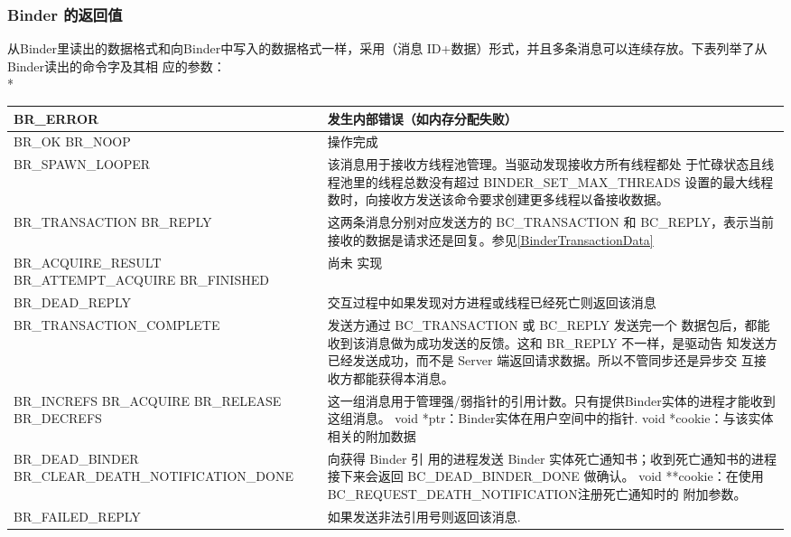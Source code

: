 \documentclass[a4paper,11pt]{article}
\begin{document}
\subsubsection{Binder 的返回值}
从Binder里读出的数据格式和向Binder中写入的数据格式一样，采用（消息
ID+数据）形式，并且多条消息可以连续存放。下表列举了从Binder读出的命令字及其相
应的参数：\\*
\begin{longtable}{|p{}|p{}|}\hline
    BR_ERROR & 发生内部错误（如内存分配失败） \\\hline
    BR_OK \newline BR_NOOP & 操作完成 \\\hline
    BR_SPAWN_LOOPER & 该消息用于接收方线程池管理。当驱动发现接收方所有线程都处
    于忙碌状态且线程池里的线程总数没有超过 BINDER_SET_MAX_THREADS
    设置的最大线程数时，向接收方发送该命令要求创建更多线程以备接收数据。
    \\\hline
    BR_TRANSACTION \newline BR_REPLY & 这两条消息分别对应发送方的
    BC_TRANSACTION 和 BC_REPLY，表示当前接收的数据是请求还是回复。参见\ref{BinderTransactionData}\\\hline
    BR_ACQUIRE_RESULT \newline BR_ATTEMPT_ACQUIRE \newline BR_FINISHED & 尚未
    实现 \\\hline
    BR_DEAD_REPLY & 交互过程中如果发现对方进程或线程已经死亡则返回该消息
    \\\hline
    BR_TRANSACTION_COMPLETE & 发送方通过 BC_TRANSACTION 或 BC_REPLY 发送完一个
    数据包后，都能收到该消息做为成功发送的反馈。这和 BR_REPLY 不一样，是驱动告
    知发送方已经发送成功，而不是 Server 端返回请求数据。所以不管同步还是异步交
    互接收方都能获得本消息。\\\hline
    BR_INCREFS \newline  BR_ACQUIRE \newline BR_RELEASE \newline BR_DECREFS \newline
    & 这一组消息用于管理强/弱指针的引用计数。只有提供Binder实体的进程才能收到这组消息。
   void *ptr：Binder实体在用户空间中的指针.  void *cookie：与该实体相关的附加数据 \\\hline
   BR_DEAD_BINDER \newline BR_CLEAR_DEATH_NOTIFICATION_DONE & 向获得 Binder 引
   用的进程发送 Binder 实体死亡通知书；收到死亡通知书的进程接下来会返回
   BC_DEAD_BINDER_DONE 做确认。
   \newline void **cookie：在使用BC_REQUEST_DEATH_NOTIFICATION注册死亡通知时的
   附加参数。\\\hline
   BR_FAILED_REPLY & 如果发送非法引用号则返回该消息. \\\hline
\end{longtable}
\end{document}
